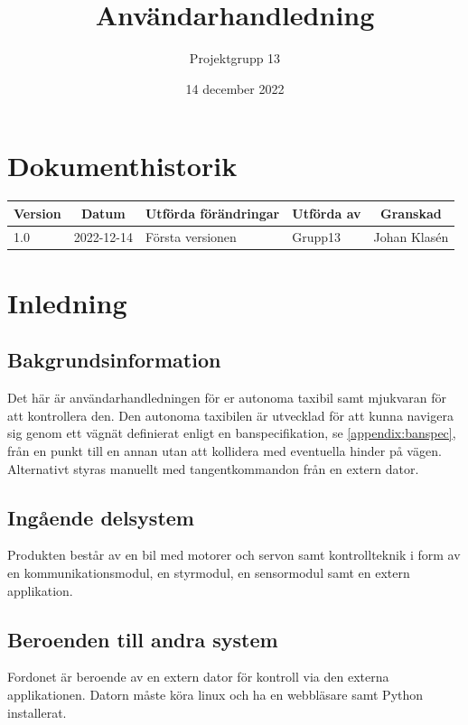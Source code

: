 \documentclass[10pt,oneside,swedish]{lips}
\title{Användarhandledning}
\author{Projektgrupp 13}
\date{14 december 2022}
\begin{document}


\cleardoublepage
\tableofcontents

\cleardoublepage
\section*{Dokumenthistorik}
\begin{tabular}{p{}|p{}|p{}|p{}|p{}} 
  \multicolumn{1}{c}{\bfseries Version} & 
  \multicolumn{1}{|c}{\bfseries Datum} & 
  \multicolumn{1}{|c}{\bfseries Utförda förändringar} & 
  \multicolumn{1}{|c}{\bfseries Utförda av} & 
  \multicolumn{1}{|c}{\bfseries Granskad}\\
  \hline
  \hline
  1.0 & 2022-12-14 & Första versionen & Grupp13 & Johan Klasén   \\
  \hline
\end{tabular}

\cleardoublepage
{}\cfoot{\thepage}

\section{Inledning}
\subsection{Bakgrundsinformation}
Det här är användarhandledningen för er autonoma taxibil samt mjukvaran för att kontrollera den. 
Den autonoma taxibilen är utvecklad för att kunna navigera sig genom ett vägnät definierat enligt en banspecifikation, se \ref{appendix:banspec}, från en punkt till en annan utan att kollidera med eventuella hinder på vägen. Alternativt styras manuellt med tangentkommandon från en extern dator.

\subsection{Ingående delsystem}
Produkten består av en bil med motorer och servon samt kontrollteknik i form av en kommunikationsmodul, en styrmodul, en sensormodul samt en extern applikation.

\subsection{Beroenden till andra system}
Fordonet är beroende av en extern dator för kontroll via den externa applikationen. Datorn måste köra linux och ha en webbläsare samt Python installerat.
\end{document}
